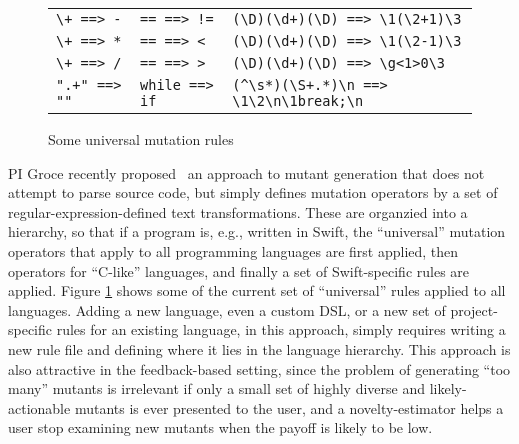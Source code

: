 \begin{figure}
\begin{tabularx}{0.75\textwidth}{XXX}
\verb|\+ ==> -| & \verb|== ==> !=| & \verb|(\D)(\d+)(\D) ==> \1(\2+1)\3|\\
\verb|\+ ==> *| & \verb|== ==> <| & \verb|(\D)(\d+)(\D) ==> \1(\2-1)\3|\\
\verb|\+ ==> /| & \verb|== ==> >| & \verb|(\D)(\d+)(\D) ==> \g<1>0\3|\\
\verb|".+" ==> ""| & \verb|while ==> if| & \verb|(^\s*)(\S+.*)\n ==> \1\2\n\1break;\n|\\
\end{tabularx}
\caption{Some universal mutation rules}
\label{fig:rules}
\end{figure}

PI Groce recently proposed~\cite{regexpMut} an approach to mutant generation that does not attempt to parse source code, but simply defines mutation operators by a set of regular-expression-defined text transformations.  These are organzied into a hierarchy, so that if a program is, e.g., written in Swift, the ``universal'' mutation operators that apply to all programming languages are first applied, then operators for ``C-like'' languages, and finally a set of Swift-specific rules are applied.  Figure \ref{fig:rules} shows some of the current set of ``universal'' rules applied to all languages.  Adding a new language, even a custom DSL, or a new set of project-specific rules for an existing language, in this approach, simply requires writing a new rule file and defining where it lies in the language hierarchy.  This approach is also attractive in the feedback-based setting, since the problem of generating ``too many'' mutants is irrelevant if only a small set of highly diverse and likely-actionable mutants is ever presented to the user, and a novelty-estimator helps a user stop examining new mutants when the payoff is likely to be low.

